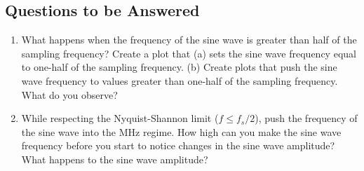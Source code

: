 \documentclass{article}
\begin{document}
\subsection{Questions to be Answered}

\begin{enumerate}
\item What happens when the frequency of the sine wave is greater than half of the sampling frequency?  Create a plot that (a) sets the sine wave frequency equal to one-half of the sampling frequency.  (b) Create plots that push the sine wave frequency to values greater than one-half of the sampling frequency.  What do you observe? \\ \vspace{3cm}
\item While respecting the Nyquist-Shannon limit ($f \leq f_s/2$), push the frequency of the sine wave into the MHz regime.  How high can you make the sine wave frequency before you start to notice changes in the sine wave amplitude?  What happens to the sine wave amplitude?
\end{enumerate}
\end{document}
